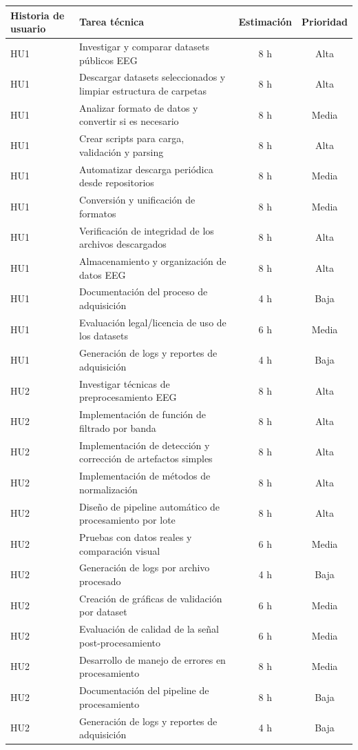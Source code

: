 \documentclass[
11pt, %
]{charter}
\begin{document}
\begin{table}[htpb]
\centering
\begin{tabularx}{\linewidth}{@{}|X|X|c|c|@{}}
\hline
\rowcolor[HTML]{C0C0C0}
Historia de usuario & Tarea técnica & Estimación & Prioridad \\ \hline
HU1 & Investigar y comparar datasets públicos EEG & 8 h & Alta \\ \hline
HU1 & Descargar datasets seleccionados y limpiar estructura de carpetas & 8 h & Alta \\ \hline
HU1 & Analizar formato de datos y convertir si es necesario	 & 8 h & Media \\ \hline
HU1 & Crear scripts para carga, validación y parsing		 & 8 h & Alta \\ \hline
HU1 & Automatizar descarga periódica desde repositorios			 & 8 h & Media \\ \hline
HU1 & Conversión y unificación de formatos		 & 8 h & Media \\ \hline
HU1 & Verificación de integridad de los archivos descargados			 & 8 h & Alta \\ \hline
HU1 & Almacenamiento y organización de datos EEG				 & 8 h & Alta \\ \hline
HU1 & Documentación del proceso de adquisición				 & 4 h & Baja \\ \hline
HU1 & Evaluación legal/licencia de uso de los datasets				 & 6 h & Media \\ \hline
HU1 & Generación de logs y reportes de adquisición				 & 4 h & Baja \\ \hline
HU2 & Investigar técnicas de preprocesamiento EEG						 & 8 h & Alta \\ \hline
HU2 & Implementación de función de filtrado por banda					 & 8 h & Alta \\ \hline
HU2 & Implementación de detección y corrección de artefactos simples					 & 8 h & Alta \\ \hline
HU2 & Implementación de métodos de normalización 					 & 8 h & Alta \\ \hline
HU2 & Diseño de pipeline automático de procesamiento por lote					 & 8 h & Alta \\ \hline
HU2 & Pruebas con datos reales y comparación visual					 & 6 h & Media \\ \hline
HU2 & Generación de logs por archivo procesado				 & 4 h & Baja \\ \hline
HU2 & Creación de gráficas de validación por dataset					 & 6 h & Media \\ \hline
HU2 & Evaluación de calidad de la señal post-procesamiento					 & 6 h & Media \\ \hline
HU2 & Desarrollo de manejo de errores en procesamiento					 & 8 h & Media \\ \hline
HU2 & Documentación del pipeline de procesamiento					 & 8 h & Baja \\ \hline
HU2 & Generación de logs y reportes de adquisición				 & 4 h & Baja \\ \hline


\end{tabularx}
\end{table}
\end{document}
